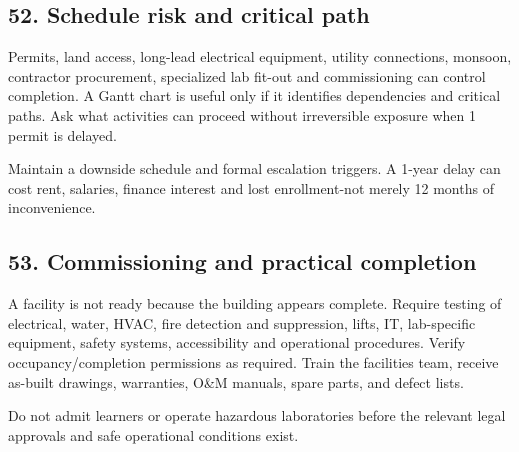 \subsection{52. Schedule risk and critical path}

Permits, land access, long-lead electrical equipment, utility connections, monsoon, contractor procurement, specialized lab fit-out and commissioning can control completion. A Gantt chart is useful only if it identifies dependencies and critical paths. Ask what activities can proceed without irreversible exposure when 1 permit is delayed.

Maintain a downside schedule and formal escalation triggers. A 1-year delay can cost rent, salaries, finance interest and lost enrollment-not merely 12 months of inconvenience.


\subsection{53. Commissioning and practical completion}

A facility is not ready because the building appears complete. Require testing of electrical, water, HVAC, fire detection and suppression, lifts, IT, lab-specific equipment, safety systems, accessibility and operational procedures. Verify occupancy/completion permissions as required. Train the facilities team, receive as-built drawings, warranties, O\&M manuals, spare parts, and defect lists.

Do not admit learners or operate hazardous laboratories before the relevant legal approvals and safe operational conditions exist.
